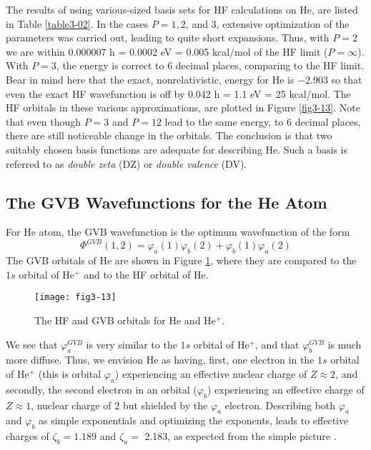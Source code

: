 The results of using various-sized basis sets for HF calculations on
He, are listed in Table \ref{table3-02}. In the cases $P = 1, 2$, and
3, extensive optimization of the parameters was carried out, leading
to quite short expansions. Thus, with $P = 2$ we are within 0.000007 h
= 0.0002 eV = 0.005 kcal/mol of the HF limit ($P = \infty$). With $P =
3$, the energy is correct to 6 decimal places, comparing to the HF
limit.  Bear in mind here that the exact, nonrelativistic, energy for
He is $-$2.903 so that even the exact HF wavefunction is off by 0.042
h = 1.1 eV = 25 kcal/mol. The HF orbitals in these various
approximations, are plotted in Figure \ref{fig3-13}. Note that even
though $P = 3$ and $P = 12$ lead to the same energy, to 6 decimal
places, there are still noticeable change in the orbitals. The
conclusion is that two suitably chosen basis functions are adequate
for describing He. Such a basis is referred to as \emph{double zeta}
(DZ) or \emph{double valence} (DV).

\subsection{The GVB Wavefunctions for the He Atom}

For He atom, the GVB wavefunction is the optimum
wavefunction of the form
\begin{equation}
\Phi^{GVB} (1,2) = \varphi_a (1) \varphi_b (2) + \varphi_b (1) \varphi_a (2)
\end{equation}
The GVB orbitals of He are shown in Figure
\ref{fig3-14}, where they are compared to the $1s$ orbital of He$^+$
and to the HF orbital of He.

\begin{figure}
\texttt{[image: fig3-13]}
\caption{The HF and GVB orbitals for He and He$^+$.}
\label{fig3-14}
\end{figure}

We see that $\varphi^{GVB}_a$ is very similar to the $1s$ orbital of
He$^+$, and that $\varphi^{GVB}_b$ is much more diffuse.  Thus, we
envision He as having, first, one electron in the $1s$ orbital of
He$^+$ (this is orbital $\varphi_a$) experiencing an effective nuclear
charge of $Z \approx 2$, and secondly, the second electron in an
orbital ($\varphi_b$) experiencing an effective charge of $Z \approx
1$, nuclear charge of 2 but shielded by the $\varphi_a$ electron.
Describing both $\varphi_a$ and $\varphi_b$ as simple exponentials and
optimizing the exponents, leads to effective charges of $\zeta_b =
1.189$ and $\zeta_a =$ 2.183, as expected from the simple
picture \cite{chap3-ref15}.

